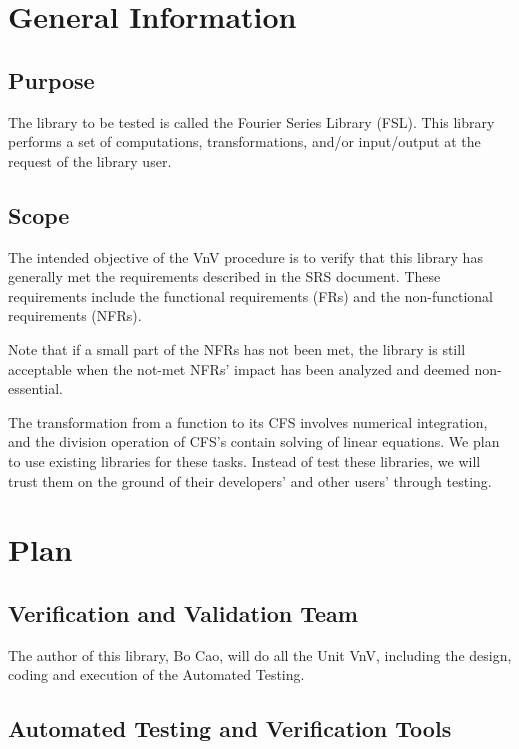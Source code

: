 \documentclass[12pt, titlepage]{article}
\begin{document}
\section{General Information}

\subsection{Purpose}

The library to be tested is called the Fourier Series Library (FSL). This library performs a set of computations, transformations, and/or input/output at the request of the library user.

\subsection{Scope}

The intended objective of the VnV procedure is to verify that this library has generally met the requirements described in the SRS document. These requirements include the functional requirements (FRs) and the non-functional requirements (NFRs).

Note that if a small part of the NFRs has not been met, the library is still acceptable when the not-met NFRs' impact has been analyzed and deemed non-essential.

The transformation from a function to its CFS involves numerical integration, and the division operation of CFS's contain solving of linear equations. We plan to use existing libraries for these tasks. Instead of test these libraries, we will trust them on the ground of their developers' and other users' through testing.

\section{Plan}
	
\subsection{Verification and Validation Team}

The author of this library, Bo Cao, will do all the Unit VnV, including the design, coding and execution of the Automated Testing.


\subsection{Automated Testing and Verification Tools}
\end{document}
